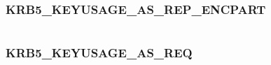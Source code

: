 \documentclass[letterpaper,10pt,english]{sphinxmanual}
\begin{document}
\begin{fulllineitems}
\label{appdev/refs/macros/KRB5_KEYUSAGE_AP_REQ_AUTH_CKSUM:KRB5_KEYUSAGE_AP_REQ_AUTH_CKSUM}
\end{fulllineitems}


\begin{tabulary}{\linewidth}{|L|L|}
\hline

 & 
\\
\hline\end{tabulary}



\subsubsection{KRB5\_KEYUSAGE\_AS\_REP\_ENCPART}
\label{appdev/refs/macros/KRB5_KEYUSAGE_AS_REP_ENCPART:krb5-keyusage-as-rep-encpart-data}\label{appdev/refs/macros/KRB5_KEYUSAGE_AS_REP_ENCPART::doc}\label{appdev/refs/macros/KRB5_KEYUSAGE_AS_REP_ENCPART:krb5-keyusage-as-rep-encpart}

\begin{fulllineitems}
\label{appdev/refs/macros/KRB5_KEYUSAGE_AS_REP_ENCPART:KRB5_KEYUSAGE_AS_REP_ENCPART}
\end{fulllineitems}


\begin{tabulary}{\linewidth}{|L|L|}
\hline

 & 
\\
\hline\end{tabulary}



\subsubsection{KRB5\_KEYUSAGE\_AS\_REQ}
\label{appdev/refs/macros/KRB5_KEYUSAGE_AS_REQ:krb5-keyusage-as-req-data}\label{appdev/refs/macros/KRB5_KEYUSAGE_AS_REQ:krb5-keyusage-as-req}\label{appdev/refs/macros/KRB5_KEYUSAGE_AS_REQ::doc}

\begin{fulllineitems}
\label{appdev/refs/macros/KRB5_KEYUSAGE_AS_REQ:KRB5_KEYUSAGE_AS_REQ}
\end{fulllineitems}
\end{document}
